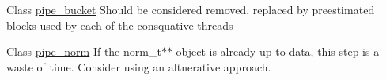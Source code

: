 \label{todo__todo000001}
\hypertarget{todo__todo000001}{}
 
\begin{DoxyDescription}
\item[Class \hyperlink{classpipe__bucket}{pipe\_\-bucket} ]Should be considered removed, replaced by preestimated blocks used by each of the consquative threads 
\end{DoxyDescription}

\label{todo__todo000003}
\hypertarget{todo__todo000003}{}
 
\begin{DoxyDescription}
\item[Class \hyperlink{classpipe__norm}{pipe\_\-norm} ]If the norm\_\-t$\ast$$\ast$ object is already up to data, this step is a waste of time. Consider using an altnerative approach. 
\end{DoxyDescription}